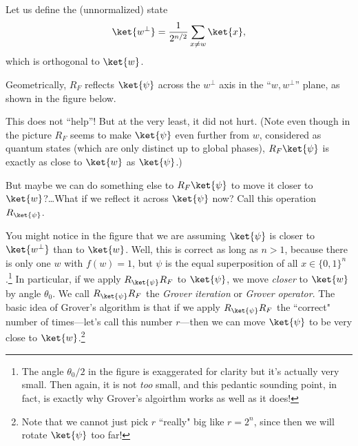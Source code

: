 \documentclass{article}
\begin{document}
Let us define the (unnormalized) state
\[\ket{w^{\perp}} = \frac{1}{2^{n/2}}\sum_{x \neq w}\ket{x}, \] which is orthogonal to $\ket{w}$. 

Geometrically, $R_F$ reflects $\ket{\psi}$ across the $w^{\perp}$ axis in the ``$w,w^{\perp}$'' plane, as shown in the figure below.

This does not ``help''! But at the very least, it did not hurt. (Note even though in the picture $R_F$ seems to make $\ket{\psi}$ even further from $w$, considered as quantum states (which are only distinct up to global phases), $R_F\ket{\psi}$ is exactly as close to $\ket{w}$ as $\ket{\psi}$.)

But maybe we can do something else to $R_F\ket{\psi}$ to move it closer to $\ket{w}$?\dots What if we reflect it across $\ket{\psi}$ now? Call this operation $R_{\ket{\psi}}$.

\begin{center}
\end{center}


You might notice in the figure that we are assuming $\ket{\psi}$ is closer to $\ket{w^{\perp}}$ than to $\ket{w}$.  Well, this is correct as long as $n>1$, because there is only one $w$ with $f(w)=1$, but $\psi$ is the equal superposition of all $x \in \{0,1\}^n$.\footnote{The angle $\theta_0/2$ in the figure is exaggerated for clarity but it's actually very small.  Then again, it is not \emph{too} small, and this pedantic sounding point, in fact, is exactly why Grover's algoirthm works as well as it does!} In particular, if we apply $R_{\ket{\psi}}R_F$ to $\ket{\psi}$, we move \emph{closer} to $\ket{w}$ by angle $\theta_0$.  We call $R_{\ket{\psi}}R_F$ the \emph{Grover iteration} or \emph{Grover operator}.  The basic idea of Grover's algorithm is that if we apply $R_{\ket{\psi}} R_F$ the ``correct" number of times---let's call this number $r$---then we can move $\ket{\psi}$ to be very close to $\ket{w}$.\footnote{Note that we cannot just pick $r$ ``really" big like $r = 2^{n}$, since then we will rotate $\ket{\psi}$ too far!}
\end{document}
